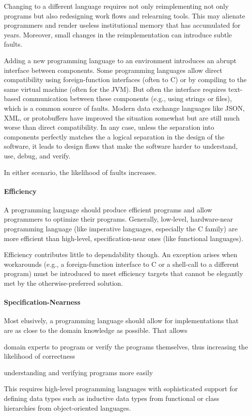 Changing to a different language requires not only reimplementing not only programs but also redesigning work flows and relearning tools.
This may alienate programmers and render useless institutional memory that has accumulated for years.
Moreover, small changes in the reimplementation can introduce subtle faults.

Adding a new programming language to an environment introduces an abrupt interface between components.
Some programming languages allow direct compatibility using foreign-function interfaces (often to C) or by compiling to the same virtual machine (often for the JVM).
But often the interface requires text-based communication between these components (e.g., using strings or files), which is a common source of faults.
Modern data exchange languages like JSON, XML, or protobuffers have improved the situation somewhat but are still much worse than direct compatibility.
In any case, unless the separation into components perfectly matches the a logical separation in the design of the software, it leads to design flaws that make the software harder to understand, use, debug, and verify.

In either scenario, the likelihood of faults increases.

\paragraph{Efficiency}
A programming language should produce efficient programs and allow programmers to optimize their programs.
Generally, low-level, hardware-near programming language (like imperative languages, especially the C family) are more efficient than high-level, specification-near ones (like functional languages).

Efficiency contributes little to dependability though.
An exception arises when workarounds (e.g., a foreign-function interface to C or a shell-call to a different program) must be introduced to meet efficiency targets that cannot be elegantly met by the otherwise-preferred solution.

\paragraph{Specification-Nearness}
Most elusively, a programming language should allow for implementations that are as close to the domain knowledge as possible.
That allows
\begin{compactitem}
 \item domain experts to program or verify the programs themselves, thus increasing the likelihood of correctness
 \item understanding and verifying programs more easily
\end{compactitem}
This requires high-level programming languages with sophisticated support for defining data types such as inductive data types from functional or class hierarchies from object-oriented languages.


